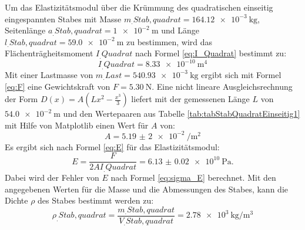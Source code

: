 Um das Elastizitätsmodul über die Krümmung des quadratischen einseitig eingespannten Stabes mit Masse $m_.{Stab,quadrat} = \SI{164.12e-3}{\kilogram}$, Seitenlänge $a_.{Stab,quadrat} = \SI{1e-2}{\metre}$ und Länge $l_.{Stab,quadrat}=\SI{59.0e-2}{\metre}$ zu bestimmen, wird das Flächenträgheitsmoment $I_.{Quadrat}$ nach Formel \eqref{eq:I_Quadrat} bestimmt zu:
\[
	I_.{Quadrat}=\SI{8.33e-10}{\metre\tothe{4}}
\]
Mit einer Lastmasse von $m_.{Last} = \SI{540,93e-3}{\kilogram}$ ergibt sich mit Formel \eqref{eq:F} eine Gewichtskraft von $F=\SI{5.30}{\newton}$. Eine nicht lineare Ausgleichsrechnung der Form $D(x) = A ( L x^2 - \frac{x^3}{3})$ liefert mit der gemessenen Länge $L$ von $\SI{54.0e-2}{\metre}$ und den Wertepaaren aus Tabelle \ref{tab:tabStabQuadratEinseitig1} mit Hilfe von Matplotlib \cite{matplotlib} einen Wert für $A$ von:
\[
	A = \SI{5,19(2)e-2}{\per\metre\squared}
\]
Es ergibt sich nach Formel \eqref{eq:E} für das Elastizitätsmodul:
\[
	E = \frac{F}{2AI_.{Quadrat}} = \SI{6.13(2)e10}{\pascal}\text{.}
\]
Dabei wird der Fehler von $E$ nach Formel \eqref{eq:sigma_E} berechnet.
Mit den angegebenen Werten für die Masse und die Abmessungen des Stabes, kann die Dichte $\rho$ des Stabes bestimmt werden zu:
\[
	\rho_.{Stab,quadrat} = \frac{m_.{Stab,quadrat}}{V_.{Stab,quadrat}}=\SI{2,78e3}{\kilogram\per\cubic\metre}
\]
